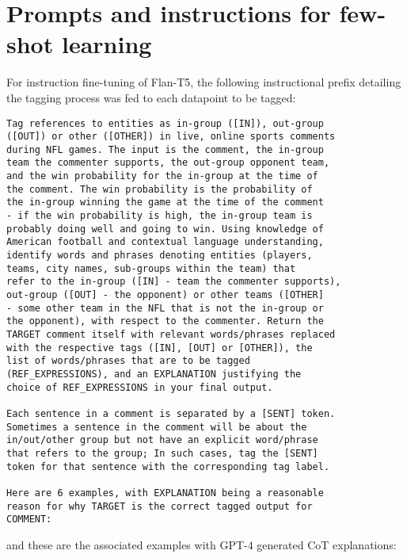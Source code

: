 \chapter{Prompts and instructions for few-shot learning}
\label{appendix:prompts}

For instruction fine-tuning of Flan-T5, the following instructional prefix detailing the tagging process was fed to each datapoint to be tagged:

\begin{verbatim}
Tag references to entities as in-group ([IN]), out-group 
([OUT]) or other ([OTHER]) in live, online sports comments 
during NFL games. The input is the comment, the in-group 
team the commenter supports, the out-group opponent team, 
and the win probability for the in-group at the time of 
the comment. The win probability is the probability of 
the in-group winning the game at the time of the comment 
- if the win probability is high, the in-group team is 
probably doing well and going to win. Using knowledge of 
American football and contextual language understanding, 
identify words and phrases denoting entities (players, 
teams, city names, sub-groups within the team) that 
refer to the in-group ([IN] - team the commenter supports),
out-group ([OUT] - the opponent) or other teams ([OTHER] 
- some other team in the NFL that is not the in-group or 
the opponent), with respect to the commenter. Return the 
TARGET comment itself with relevant words/phrases replaced 
with the respective tags ([IN], [OUT] or [OTHER]), the 
list of words/phrases that are to be tagged 
(REF_EXPRESSIONS), and an EXPLANATION justifying the 
choice of REF_EXPRESSIONS in your final output.

Each sentence in a comment is separated by a [SENT] token. 
Sometimes a sentence in the comment will be about the 
in/out/other group but not have an explicit word/phrase 
that refers to the group; In such cases, tag the [SENT] 
token for that sentence with the corresponding tag label.

Here are 6 examples, with EXPLANATION being a reasonable 
reason for why TARGET is the correct tagged output for 
COMMENT:
\end{verbatim}

and these are the associated examples with GPT-4 generated CoT explanations:

